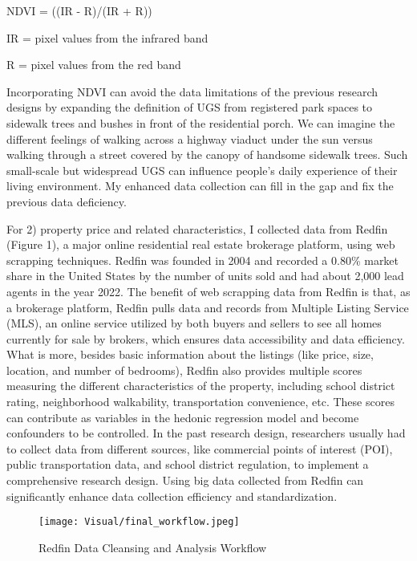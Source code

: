 \begin{center}
NDVI = ((IR - R)/(IR + R)) 

IR = pixel values from the infrared band

R = pixel values from the red band
\end{center}

Incorporating NDVI can avoid the data limitations of the previous research designs by expanding the definition of UGS from registered park spaces to sidewalk trees and bushes in front of the residential porch. We can imagine the different feelings of walking across a highway viaduct under the sun versus walking through a street covered by the canopy of handsome sidewalk trees. Such small-scale but widespread UGS can influence people’s daily experience of their living environment. My enhanced data collection can fill in the gap and fix the previous data deficiency.

For 2) property price and related characteristics, I collected data from Redfin (Figure 1), a major online residential real estate brokerage platform, using web scrapping techniques. Redfin was founded in 2004 and recorded a 0.80\% market share in the United States by the number of units sold and had about 2,000 lead agents in the year 2022. The benefit of web scrapping data from Redfin is that, as a brokerage platform, Redfin pulls data and records from Multiple Listing Service (MLS), an online service utilized by both buyers and sellers to see all homes currently for sale by brokers, which ensures data accessibility and data efficiency. What is more, besides basic information about the listings (like price, size, location, and number of bedrooms), Redfin also provides multiple scores measuring the different characteristics of the property, including school district rating, neighborhood walkability, transportation convenience, etc. These scores can contribute as variables in the hedonic regression model and become confounders to be controlled. In the past research design, researchers usually had to collect data from different sources, like commercial points of interest (POI), public transportation data, and school district regulation, to implement a comprehensive research design. Using big data collected from Redfin can significantly enhance data collection efficiency and standardization.

\begin{figure}[h]
    \centering
    \texttt{[image: Visual/‎final\_workflow.jpeg]}
    \caption{Redfin Data Cleansing and Analysis Workflow}
\end{figure}


